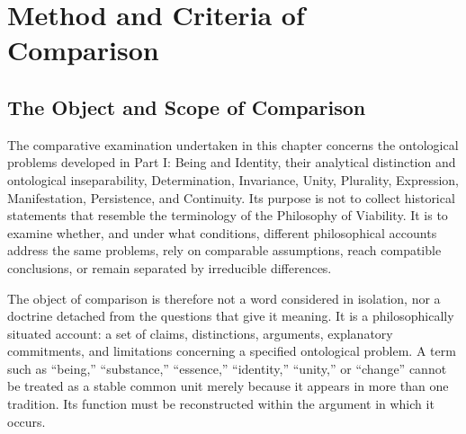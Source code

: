 %
%

\section{Method and Criteria of Comparison}
\label{sec:ch08-method-and-criteria}

\subsection{The Object and Scope of Comparison}
\label{sec:ch08-s01-ss01}

\label{para:VS.B01.P01.C08.S01.SS01.P001}
The comparative examination undertaken in this chapter concerns
the ontological problems developed in Part I: Being and Identity,
their analytical distinction and ontological inseparability,
Determination, Invariance, Unity, Plurality, Expression,
Manifestation, Persistence, and Continuity. Its purpose is not
to collect historical statements that resemble the terminology
of the Philosophy of Viability. It is to examine whether, and
under what conditions, different philosophical accounts address
the same problems, rely on comparable assumptions, reach
compatible conclusions, or remain separated by irreducible
differences.

\label{para:VS.B01.P01.C08.S01.SS01.P002}
The object of comparison is therefore not a word considered in
isolation, nor a doctrine detached from the questions that give
it meaning. It is a philosophically situated account: a set of
claims, distinctions, arguments, explanatory commitments, and
limitations concerning a specified ontological problem. A term
such as ``being,'' ``substance,'' ``essence,'' ``identity,''
``unity,'' or ``change'' cannot be treated as a stable common
unit merely because it appears in more than one tradition.
Its function must be reconstructed within the argument in which
it occurs.

